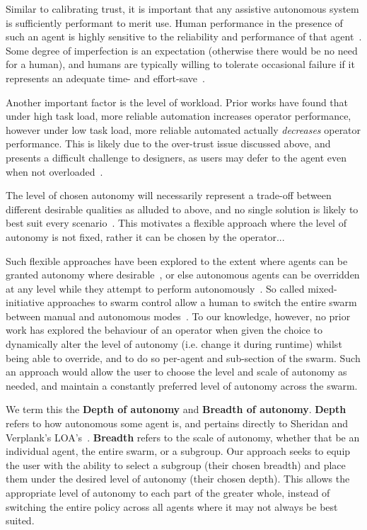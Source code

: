 \documentclass[10pt]{article}
\theoremstyle{definition}
\begin{document}
Similar to calibrating trust, it is important that any assistive autonomous system is sufficiently performant to merit use. Human performance in the presence of such an agent is highly sensitive to the reliability and performance of that agent~\cite{rovira_effects_2007}. Some degree of imperfection is an expectation (otherwise there would be no need for a human), and humans are typically willing to tolerate occasional failure if it represents an adequate time- and effort-save~\cite{NNED SOMETHING HERE}.


Another important factor is the level of workload. Prior works have found that under high task load, more reliable automation increases operator performance, however under low task load, more reliable automated actually \textit{decreases} operator performance. This is likely due to the over-trust issue discussed above, and presents a difficult challenge to designers, as users may defer to the agent even when not overloaded~\cite{parasuraman_adaptive_2009}.


The level of chosen autonomy will necessarily represent a trade-off between different desirable qualities as alluded to above, and no single solution is likely to best suit every scenario~\cite{miller_delegation_nodate}. This motivates a flexible approach where the level of autonomy is not fixed, rather it can be chosen by the operator...

Such flexible approaches have been explored to the extent where agents can be granted autonomy where desirable~\cite{hardin_using_nodate}, or else autonomous agents can be overridden at any level while they attempt to perform autonomously~\cite{alero-gomez_impact_2011}. So called mixed-initiative approaches to swarm control allow a human to switch the entire swarm between manual and autonomous modes~\cite{nam_trust_2018}. To our knowledge, however, no prior work has explored the behaviour of an operator when given the choice to dynamically alter the level of autonomy (i.e. change it during runtime) whilst being able to override, and to do so per-agent and sub-section of the swarm. Such an approach would allow the user to choose the level and scale of autonomy as needed, and maintain a constantly preferred level of autonomy across the swarm.

We term this the \textbf{Depth of autonomy} and \textbf{Breadth of autonomy}. \textbf{Depth} refers to how autonomous some agent is, and pertains directly to Sheridan and Verplank's LOA's~\cite{sheridan1978human}. \textbf{Breadth} refers to the scale of autonomy, whether that be an individual agent, the entire swarm, or a subgroup. Our approach seeks to equip the user with the ability to select a subgroup (their chosen breadth) and place them under the desired level of autonomy (their chosen depth). This allows the appropriate level of autonomy to each part of the greater whole, instead of switching the entire policy across all agents where it may not always be best suited.
\end{document}
